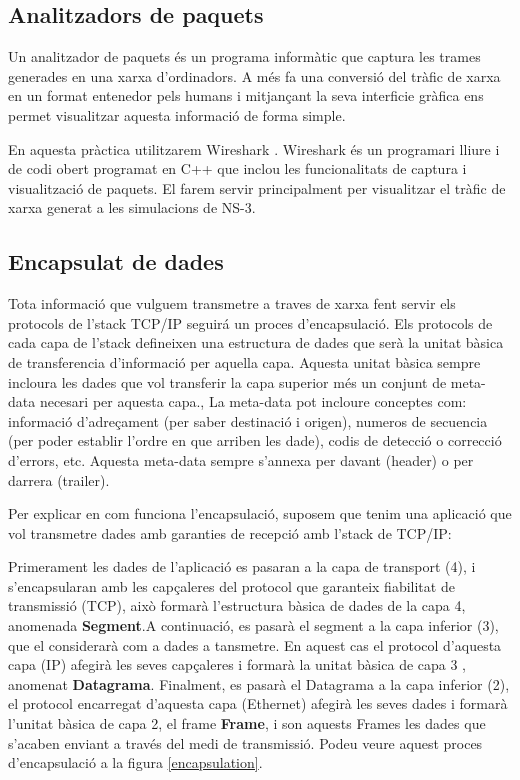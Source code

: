 \documentclass[12pt,a4paper]{article}
\begin{document}

\subsection*{Analitzadors de paquets}
Un analitzador de paquets és un programa informàtic que captura les trames generades en una xarxa d'ordinadors. A més fa una conversió del tràfic de xarxa en un format entenedor pels humans i mitjançant la seva interficie gràfica  ens permet visualitzar aquesta informació de forma simple.

En aquesta pràctica utilitzarem Wireshark \cite{wireshark}. Wireshark és un programari lliure i de codi obert programat en C++ que inclou les funcionalitats de captura i visualització de paquets. El farem servir principalment per visualitzar el tràfic de xarxa generat a les simulacions de NS-3.

\subsection*{Encapsulat de dades}

Tota informació que vulguem transmetre a traves de xarxa fent servir els protocols de l'stack TCP/IP seguirá un proces d'encapsulació.
Els protocols de cada capa de l'stack defineixen una estructura de dades que serà la unitat bàsica de transferencia d'informació per aquella capa.
Aquesta unitat bàsica sempre incloura les dades que vol transferir la capa superior més un conjunt de meta-data necesari per aquesta capa., 
La meta-data pot incloure conceptes com: informació d'adreçament (per saber destinació i origen), numeros de secuencia (per poder establir
l'ordre en que arriben les dade), codis de detecció o correcció d'errors, etc. Aquesta meta-data sempre s'annexa per davant (header) o per darrera (trailer).

Per explicar en com funciona l'encapsulació, suposem que tenim una aplicació que vol transmetre dades amb garanties de recepció amb l'stack de TCP/IP:

Primerament les dades de l'aplicació es pasaran a la capa de transport (4), i s'encapsularan amb les capçaleres del protocol que garanteix fiabilitat de transmissió (TCP),
això formarà l'estructura bàsica de dades de la capa 4, anomenada \textbf{Segment}.A continuació, es pasarà el segment a la capa inferior (3), que el considerarà com a dades a tansmetre. En aquest cas el protocol d'aquesta capa (IP)
afegirà les seves capçaleres i formarà la unitat bàsica de capa 3 , anomenat \textbf{Datagrama}. Finalment, es pasarà el Datagrama a la capa inferior (2), el protocol encarregat d'aquesta capa (Ethernet) afegirà les seves dades i formarà 
l'unitat bàsica de capa 2, el frame \textbf{Frame}, i son aquests Frames les dades que s'acaben enviant a través del medi de transmissió. Podeu veure aquest proces
d'encapsulació a la figura \ref{encapsulation}.
\end{document}
